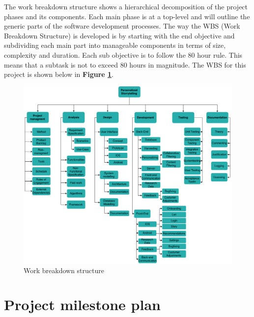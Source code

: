 The work breakdown structure shows a hierarchical decomposition of the project phases and its components. Each main phase is at a top-level and will outline the generic parts of the software development processes. The way the WBS (Work Breakdown Structure) is developed is by starting with the end objective and subdividing each main part into manageable components in terms of size, complexity and duration. Each sub objective is to follow the 80 hour rule. This means that a subtask is not to exceed 80 hours in magnitude. The WBS for this project is shown below in \textbf{Figure \ref{Fig:wbs}}. %

\begin{figure}[h!]
	\begin{center}
		\advance\leftskip-3cm
		\advance\rightskip-3cm
		\includegraphics[keepaspectratio=true,scale=0.43]{fig/wbs}
		\caption{Work breakdown structure}
		\label{Fig:wbs}
	\end{center}
\end{figure}

\section{Project milestone plan}
\label{sec:milestone_plan}

